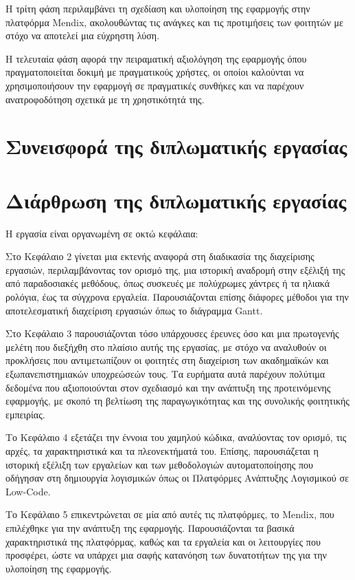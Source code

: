 		Η τρίτη φάση περιλαμβάνει τη σχεδίαση και υλοποίηση της εφαρμογής στην πλατφόρμα Mendix, ακολουθώντας τις ανάγκες και τις προτιμήσεις των φοιτητών με στόχο να αποτελεί μια εύχρηστη λύση.

		Η τελευταία φάση αφορά την πειραματική αξιολόγηση της εφαρμογής όπου πραγματοποιείται δοκιμή με πραγματικούς χρήστες, οι οποίοι καλούνται να χρησιμοποιήσουν την εφαρμογή σε πραγματικές συνθήκες και να παρέχουν ανατροφοδότηση σχετικά με τη χρηστικότητά της.


	\section{Συνεισφορά της διπλωματικής εργασίας}



	\section{Διάρθρωση της διπλωματικής εργασίας}
		Η εργασία είναι οργανωμένη σε οκτώ κεφάλαια:

		Στο Κεφάλαιο 2 γίνεται μια εκτενής αναφορά στη διαδικασία της διαχείρισης εργασιών, περιλαμβάνοντας τον ορισμό της, μια ιστορική αναδρομή στην εξέλιξή της από παραδοσιακές μεθόδους, όπως συσκευές με πολύχρωμες χάντρες ή τα ηλιακά ρολόγια, έως τα σύγχρονα εργαλεία. Παρουσιάζονται επίσης διάφορες μέθοδοι για την αποτελεσματική διαχείριση εργασιών όπως το διάγραμμα Gantt.

		Στο Κεφάλαιο 3 παρουσιάζονται τόσο υπάρχουσες έρευνες όσο και μια πρωτογενής μελέτη που διεξήχθη στο πλαίσιο αυτής της εργασίας, με στόχο να αναλυθούν οι προκλήσεις που αντιμετωπίζουν οι φοιτητές στη διαχείριση των ακαδημαϊκών και εξωπανεπιστημιακών υποχρεώσεών τους. Τα ευρήματα αυτά παρέχουν πολύτιμα δεδομένα που αξιοποιούνται στον σχεδιασμό και την ανάπτυξη της προτεινόμενης εφαρμογής, με σκοπό τη βελτίωση της παραγωγικότητας και της συνολικής φοιτητικής εμπειρίας.

		Το Κεφάλαιο 4 εξετάζει την έννοια του χαμηλού κώδικα, αναλύοντας τον ορισμό, τις αρχές, τα χαρακτηριστικά και τα πλεονεκτήματά του. Επίσης, παρουσιάζεται η ιστορική εξέλιξη των εργαλείων και των μεθοδολογιών αυτοματοποίησης που οδήγησαν στη δημιουργία λογισμικών όπως οι Πλατφόρμες Ανάπτυξης Λογισμικού σε Low-Code.

		Το Κεφάλαιο 5 επικεντρώνεται σε μία από αυτές τις πλατφόρμες, το Mendix, που επιλέχθηκε για την ανάπτυξη της εφαρμογής. Παρουσιάζονται τα βασικά χαρακτηριστικά της πλατφόρμας, καθώς και τα εργαλεία και οι λειτουργίες που προσφέρει, ώστε να υπάρχει μια σαφής κατανόηση των δυνατοτήτων της για την υλοποίηση της εφαρμογής.

